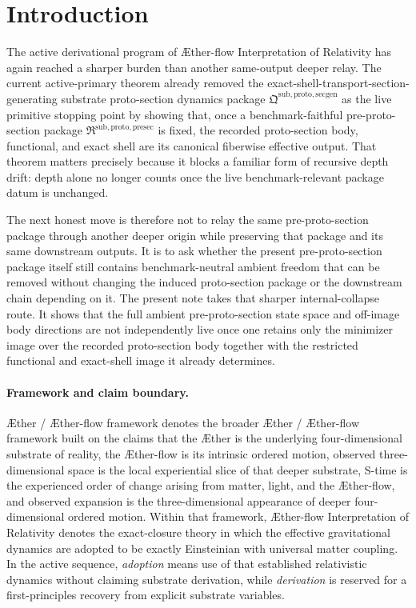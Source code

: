 \documentclass[11pt]{article}
\newcommand{\Aether}{\AE{}ther}
\newcommand{\Aflow}{\AE{}ther-flow}
\newcommand{\TheoryName}{\Aflow{} Interpretation of Relativity}
\newcommand{\TheoryProgram}{\Aether{} / \Aflow{} framework}
\newcommand{\ProtoSectionPackage}{\mathfrak Q^{\mathrm{sub,proto,secgen}}}
\newcommand{\PreProtoSectionPackage}{\mathfrak R^{\mathrm{sub,proto,presec}}}
\begin{document}
\section{Introduction}

The active derivational program of \TheoryName{} has again reached a sharper burden than another same-output deeper relay. The current active-primary theorem already removed the exact-shell-transport-section-generating substrate proto-section dynamics package \(\ProtoSectionPackage\) as the live primitive stopping point by showing that, once a benchmark-faithful pre-proto-section package \(\PreProtoSectionPackage\) is fixed, the recorded proto-section body, functional, and exact shell are its canonical fiberwise effective output. That theorem matters precisely because it blocks a familiar form of recursive depth drift: depth alone no longer counts once the live benchmark-relevant package datum is unchanged.

The next honest move is therefore not to relay the same pre-proto-section package through another deeper origin while preserving that package and its same downstream outputs. It is to ask whether the present pre-proto-section package itself still contains benchmark-neutral ambient freedom that can be removed without changing the induced proto-section package or the downstream chain depending on it. The present note takes that sharper internal-collapse route. It shows that the full ambient pre-proto-section state space and off-image body directions are not independently live once one retains only the minimizer image over the recorded proto-section body together with the restricted functional and exact-shell image it already determines.

\paragraph{Framework and claim boundary.}
\TheoryProgram{} denotes the broader \Aether{} / \Aflow{} framework built on the claims that the \Aether{} is the underlying four-dimensional substrate of reality, the \Aflow{} is its intrinsic ordered motion, observed three-dimensional space is the local experiential slice of that deeper substrate, S-time is the experienced order of change arising from matter, light, and the \Aflow{}, and observed expansion is the three-dimensional appearance of deeper four-dimensional ordered motion. Within that framework, \TheoryName{} denotes the exact-closure theory in which the effective gravitational dynamics are adopted to be exactly Einsteinian with universal matter coupling. In the active sequence, \emph{adoption} means use of that established relativistic dynamics without claiming substrate derivation, while \emph{derivation} is reserved for a first-principles recovery from explicit substrate variables.
\end{document}
